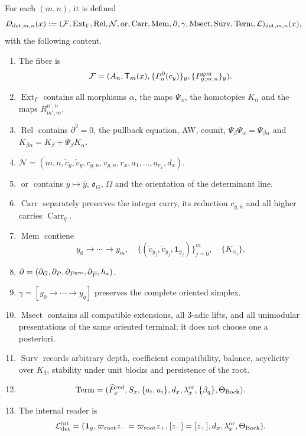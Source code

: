 For each \((m,n)\), it is defined
\begin{equation}\label{eq:detint-d-trece}
 D_{{\rm det},m,n}(x):=
 (\mathcal F,\operatorname{Ext}_\Gamma,\operatorname{Rel},
 \mathcal N,\operatorname{or},\operatorname{Carr},\operatorname{Mem},
 \partial,\gamma,\operatorname{Msect},\operatorname{Surv},
 \operatorname{Term},\mathcal L)_{{\rm det},m,n}(x),
\end{equation}
with the following content.
\begin{enumerate}
 \item The fiber is
 \[
  \mathcal F=(A_n,\mathsf T_m(x),
  \{P_n^0(c_y)\}_y,\{P^{\rm gen}_{y;m,n}\}_y).
 \]
 \item \(\operatorname{Ext}_\Gamma\) contains all morphisms
 \(\alpha\), the maps \(\Psi_\alpha\), the homotopies \(K_\alpha\) and
 the maps \(R_{m',m}^{n',n}\).
 \item \(\operatorname{Rel}\) contains \(\partial^2=0\), the
 pullback equation, AW, counit, \(\Psi_\beta\Psi_\alpha=\Psi_{\beta\alpha}\) and
 \(K_{\beta\alpha}=K_\beta+\Psi_\beta K_\alpha\).
 \item
 \(\mathcal N=(m,n,\widetilde c_y,\widetilde v_y,c_{y,n},v_{y,n},
 r_x,a_1,\ldots,a_{r_x},d_x)\).
 \item \(\operatorname{or}\) contains \(y\mapsto\bar y\),
 \(\mathfrak o_G\), \(\Omega\) and the orientation of the determinant
 line.
 \item \(\operatorname{Carr}\) separately preserves the integer carry,
 its reduction \(c_{y,n}\) and all higher carries
 \(\operatorname{Carr}_q\).
 \item \(\operatorname{Mem}\) contiene
 \[
  y_0\to\cdots\to y_m,
  \quad\{(\widetilde c_{y_j},\widetilde v_{y_j},\mathbf1_{y_j})\}_{j=0}^m,
  \quad\{K_{\alpha_j}\}.
 \]
 \item
 \(\partial=(\partial_G,\partial_P,\partial_{P^{\rm gen}},
 \partial_{\overline P},h_*)\).
 \item \(\gamma=[y_0\to\cdots\to y_q]\) preserves the complete oriented
 simplex.
 \item \(\operatorname{Msect}\) contains all compatible
 extensions, all \(3\)-adic lifts, and all unimodular
 presentations of the same oriented terminal; it does not choose one a posteriori.
 \item \(\operatorname{Surv}\) records arbitrary depth,
 coefficient compatibility, balance, acyclicity over \(K_3\),
 stability under unit blocks and persistence of the root.
 \item
 \[
  \operatorname{Term}=(\widehat P_x^{\rm red},S_x,
  \{a_i,u_i\},d_x,\lambda_x^{\rm or},
  \{\beta_q\},\Theta_{\rm Bock}).
 \]
 \item The internal reader is
 \[
  \mathcal L_{\rm det}^{\rm int}
  =(\mathbf1_y,
  \varpi_{\rm root}z_-=\varpi_{\rm root}z_+,
  [z_-]=[z_+],d_x,\lambda_x^{\rm or},\Theta_{\rm Bock}).
 \]
\end{enumerate}

